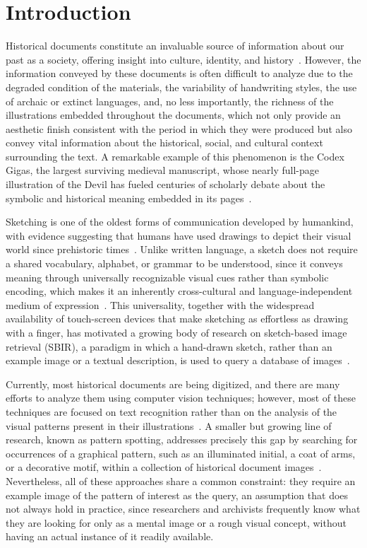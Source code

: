 \documentclass{iopjournal}
\begin{document}
\section{Introduction}

Historical documents constitute an invaluable source of information about our past as a society, offering insight into culture, identity, and history~\cite{silva2024,gellatly2015}. However, the information conveyed by these documents is often difficult to analyze due to the degraded condition of the materials, the variability of handwriting styles, the use of archaic or extinct languages, and, no less importantly, the richness of the illustrations embedded throughout the documents, which not only provide an aesthetic finish consistent with the period in which they were produced but also convey vital information about the historical, social, and cultural context surrounding the text. A remarkable example of this phenomenon is the Codex Gigas, the largest surviving medieval manuscript, whose nearly full-page illustration of the Devil has fueled centuries of scholarly debate about the symbolic and historical meaning embedded in its pages~\cite{hobvza2015codex}.

Sketching is one of the oldest forms of communication developed by humankind, with evidence suggesting that humans have used drawings to depict their visual world since prehistoric times~\cite{eitz2012sketch}. Unlike written language, a sketch does not require a shared vocabulary, alphabet, or grammar to be understood, since it conveys meaning through universally recognizable visual cues rather than symbolic encoding, which makes it an inherently cross-cultural and language-independent medium of expression~\cite{eitz2012sketch,xu2022freehand}. This universality, together with the widespread availability of touch-screen devices that make sketching as effortless as drawing with a finger, has motivated a growing body of research on sketch-based image retrieval (SBIR), a paradigm in which a hand-drawn sketch, rather than an example image or a textual description, is used to query a database of images~\cite{eitz2011benchmark,saavedra2010helo,saavedra2015lks}. 

Currently, most historical documents are being digitized, and there are many efforts to analyze them using computer vision techniques; however, most of these techniques are focused on text recognition rather than on the analysis of the visual patterns present in their illustrations~\cite{vilkomir2024,girdhar2024}. A smaller but growing line of research, known as pattern spotting, addresses precisely this gap by searching for occurrences of a graphical pattern, such as an illuminated initial, a coat of arms, or a decorative motif, within a collection of historical document images~\cite{en2016scalable,en2017dataset,ubeda2019convolutional,ubeda2020fpn,curi2022binary}. Nevertheless, all of these approaches share a common constraint: they require an example image of the pattern of interest as the query, an assumption that does not always hold in practice, since researchers and archivists frequently know what they are looking for only as a mental image or a rough visual concept, without having an actual instance of it readily available.
\end{document}
